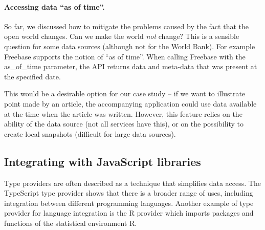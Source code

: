 \documentclass[submission,copyright,creativecommons]{eptcs}
\newcommand{\ident}[1]{\textnormal{\sffamily #1}}
\begin{document}
\vspace{-1em}
\paragraph{Accessing data ``as of time''.} 
So far, we discussed how to mitigate the problems caused by the fact that the open world changes.
Can we make the world \emph{not} change? This is a sensible question for some data sources
(although not for the World Bank). For example Freebase \cite{google-freebase} supports the 
notion of ``as of time''. When calling Freebase with the \ident{as\_of\_time} parameter, the API
returns data and meta-data that was present at the specified date.

This would be a desirable option for our case study -- if we want to illustrate point made 
by an article, the accompanying application could use data available at the time when the 
article was written. However, this feature relies on the ability of the data source (not all
services have this), or on the possibility to create local snapshots (difficult for large data
sources).


\subsection{Integrating with JavaScript libraries}
\label{sec:tp-lang}

Type providers are often described as a technique that simplifies data access. The TypeScript
type provider shows that there is a broader range of uses, including integration between different
programming languages. Another example of type provider for language integration is the R
provider \cite{fsharp-rprovider} which imports packages and functions of the statistical 
environment R.
\end{document}
